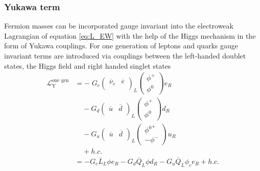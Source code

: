 \subsubsection*{Yukawa term}\label{sec:yukawa_term}
Fermion masses can be incorporated gauge invariant into the electroweak Lagrangian of equation \ref{eq:L_EW} with the help of the Higgs mechanism in the form of Yukawa couplings. For one generation of leptons and quarks gauge invariant terms are introduced via couplings between the left-handed doublet states, the Higgs field and right handed singlet states
\begin{align}
    \mathcal{L}_\mathrm{Y}^{\text{one gen}} & =
    - \; G_e
    \begin{pmatrix}
        \overline{\nu}_e & \overline{e} \\
    \end{pmatrix}_L
    \begin{pmatrix}
        \phi^+ \\
        \phi^0
    \end{pmatrix}
    e_R                                                                                                                                                                \\
                                            & \phantom{-\;}-G_d
    \begin{pmatrix}
        \overline{u} & \overline{d} \\
    \end{pmatrix}_L
    \begin{pmatrix}
        \phi^+ \\
        \phi^0
    \end{pmatrix}
    d_R                                                                                                                                                                \\
                                            & \phantom{-\;}-G_u
    \begin{pmatrix}
        \overline{u} & \overline{d} \\
    \end{pmatrix}_L
    \begin{pmatrix}
        \phi^{0*} \\
        -\phi^-
    \end{pmatrix}
    u_R                                                                                                                                                                \\
                                            & \phantom{-\;} +h.c.                                                                                                      \\
                                            & = -G_e \overline{L}_L \phi e_R -G_d \overline{Q}_L \phi d_R -G_u \overline{Q}_L \phi_c e_R + h.c. \label{eq:L_Y_one_gen}
\end{align}
